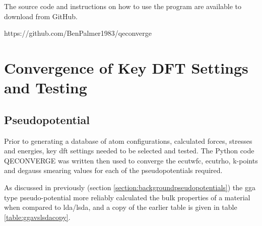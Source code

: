The source code and instructions on how to use the program are available to download from GitHub.

https://github.com/BenPalmer1983/qeconverge






\FloatBarrier
\section[DFT Parameter Convergence]{Convergence of Key DFT Settings and Testing}

\subsection{Pseudopotential}

Prior to generating a database of atom configurations, calculated forces, stresses and energies, key \acrshort{dft} settings needed to be selected and tested.  The Python code QECONVERGE was written then used to converge the ecutwfc, ecutrho, k-points and degauss smearing values for each of the pseudopotentials required.
  
As discussed in previously (section \ref{section:backgroundpseudopotentials}) the \acrshort{gga} type pseudo-potential more reliably calculated the bulk properties of a material when compared to \acrshort{lda}/\acrshort{lsda}, and a copy of the earlier table is given in table \ref{table:ggavslsdacopy}.


